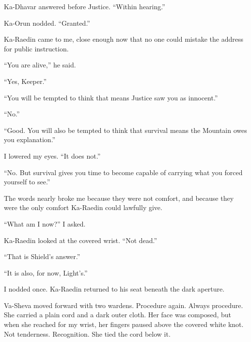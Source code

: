 Ka-Dhavar answered before Justice. ``Within hearing.''\par

Ka-Orun nodded. ``Granted.''\par

Ka-Raedin came to me, close enough now that no one could mistake the address for public instruction.\par

``You are alive,'' he said.\par

``Yes, Keeper.''\par

``You will be tempted to think that means Justice saw you as innocent.''\par

``No.''\par

``Good. You will also be tempted to think that survival means the Mountain owes you explanation.''\par

I lowered my eyes. ``It does not.''\par

``No. But survival gives you time to become capable of carrying what you forced yourself to see.''\par

The words nearly broke me because they were not comfort, and because they were the only comfort Ka-Raedin could lawfully give.\par

``What am I now?'' I asked.\par

Ka-Raedin looked at the covered wrist. ``Not dead.''\par

``That is Shield's answer.''\par

``It is also, for now, Light's.''\par

I nodded once. Ka-Raedin returned to his seat beneath the dark aperture.\par

Va-Sheva moved forward with two wardens. Procedure again. Always procedure. She carried a plain cord and a dark outer cloth. Her face was composed, but when she reached for my wrist, her fingers paused above the covered white knot. Not tenderness. Recognition. She tied the cord below it.\par

